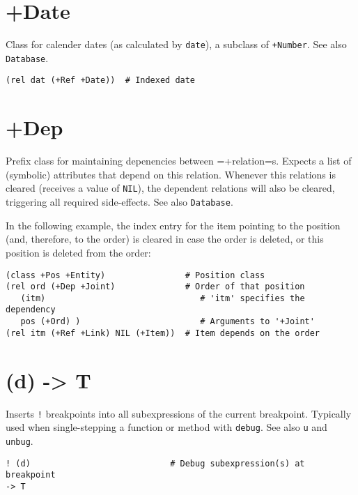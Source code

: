 {{ 
\section{+Date}
\label{sec-8-1-4-4}


Class for calender dates (as calculated by \texttt{date}), a subclass of
\texttt{+Number}. See also \texttt{Database}.


\begin{verbatim}
(rel dat (+Ref +Date))  # Indexed date
\end{verbatim}

 
\section{+Dep}
\label{sec-8-1-4-5}


Prefix class for maintaining depenencies between =+relation=s. Expects a
list of (symbolic) attributes that depend on this relation. Whenever
this relations is cleared (receives a value of \texttt{NIL}), the dependent
relations will also be cleared, triggering all required side-effects.
See also \texttt{Database}.

In the following example, the index entry for the item pointing to the
position (and, therefore, to the order) is cleared in case the order is
deleted, or this position is deleted from the order:


\begin{verbatim}
(class +Pos +Entity)                # Position class
(rel ord (+Dep +Joint)              # Order of that position
   (itm)                               # 'itm' specifies the dependency
   pos (+Ord) )                        # Arguments to '+Joint'
(rel itm (+Ref +Link) NIL (+Item))  # Item depends on the order
\end{verbatim}

 
\section{(d) -> T}
\label{sec-8-1-4-6}


Inserts \texttt{!} breakpoints into all subexpressions of the current
breakpoint. Typically used when single-stepping a function or method
with \texttt{debug}. See also \texttt{u} and \texttt{unbug}.


\begin{verbatim}
! (d)                            # Debug subexpression(s) at breakpoint
-> T
\end{verbatim}

}}
